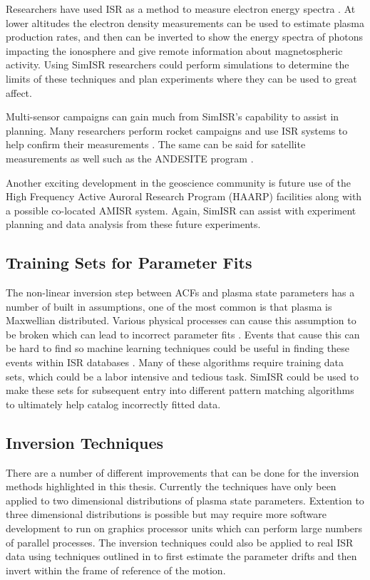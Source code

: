 Researchers have used ISR as a method to measure electron energy spectra \citep{Semeter:2005foa}. At lower altitudes the electron density measurements can be used to estimate plasma production rates, and then can be inverted to show the energy spectra of photons impacting the ionosphere and give remote information about magnetospheric activity. Using SimISR researchers could perform simulations to determine the limits of these techniques and plan experiments where they can be used to great affect.

Multi-sensor campaigns can gain much from SimISR's capability to assist in planning. Many researchers perform rocket campaigns and use ISR systems to help confirm their measurements \citep{JGRA:JGRA50924}. The same can be said for satellite measurements as well such as the ANDESITE program \citep{parham2016multi}. 

Another exciting development in the geoscience community is future use of the High Frequency Active Auroral Research Program (HAARP) facilities \citep{Bernhardt:2016il} along with a possible co-located AMISR system. Again, SimISR can assist with experiment planning and data analysis from these future experiments.



\subsection{Training Sets for Parameter Fits}

The non-linear inversion step between ACFs and plasma state parameters has a number of built in assumptions, one of the most common is that plasma is Maxwellian distributed. Various physical processes can cause this assumption to be broken which can lead to incorrect parameter fits \citep{St1979ion,Suvanto1988incoherent,Akbari:2015fv}. Events that cause this can be hard to find so machine learning techniques could be useful in finding these events within ISR databases \citep{Duda:2000:PC:954544}. Many of these algorithms require training data sets, which could be a labor intensive and tedious task. SimISR could be used to make these sets for subsequent entry into different pattern matching algorithms to ultimately help catalog incorrectly fitted data.

\subsection{Inversion Techniques}

There are a number of different improvements that can be done for the inversion methods highlighted in this thesis. Currently the techniques have only been applied to two dimensional distributions of plasma state parameters. Extention to three dimensional distributions is possible but may require more software development to run on graphics processor units which can perform large numbers of parallel processes. The inversion techniques could also be applied to real ISR data using techniques outlined in \citet{butler:imagingfregiondrifts} to first estimate the parameter drifts and then invert within the frame of reference of the motion.

